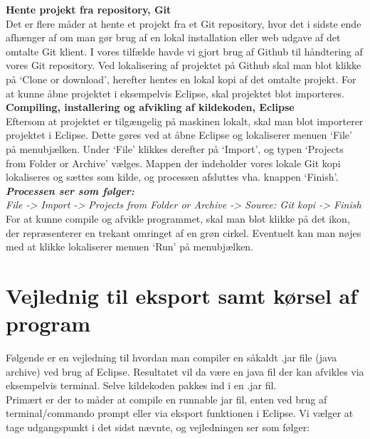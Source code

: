 \noindent \textbf{Hente projekt fra repository, Git}\\
Det er flere måder at hente et projekt fra et Git repository, hvor det i sidste ende afhænger af om man gør brug af en lokal installation eller web udgave af det omtalte Git klient. I vores tilfælde havde vi gjort brug af Github til håndtering af vores Git repository. Ved lokalisering af projektet på Github skal man blot klikke på ‘Clone or download’, herefter hentes en lokal kopi af det omtalte projekt. For at kunne åbne projektet i eksempelvis Eclipse, skal projektet blot importeres.\\

\noindent \textbf{Compiling, installering og afvikling af kildekoden, Eclipse}\\
Eftersom at projektet er tilgængelig på maskinen lokalt, skal man blot importerer projektet i Eclipse. Dette gøres ved at åbne Eclipse og lokaliserer menuen ‘File’ på menubjælken. Under ‘File’ klikkes derefter på ‘Import’, og typen ‘Projects from Folder or Archive’ vælges. Mappen der indeholder vores lokale Git kopi lokaliseres og sættes som kilde, og processen afsluttes vha. knappen ‘Finish’.\\

\noindent \textbf{\textit{Processen ser som følger:}}\\
\textit{File -> Import -> Projects from Folder or Archive -> Source: Git kopi -> Finish}\\

\noindent For at kunne compile og afvikle programmet, skal man blot klikke på det ikon, der repræsenterer en trekant omringet af en grøn cirkel. Eventuelt kan man nøjes med at klikke lokaliserer menuen ‘Run’ på menubjælken.
\newpage
\section{Vejlednig til eksport samt kørsel af program}
Følgende er en vejledning til hvordan man compiler en såkaldt .jar file (java archive) ved brug af Eclipse. Resultatet vil da være en java fil der kan afvikles via eksempelvis terminal. Selve kildekoden pakkes ind i en .jar fil.\\

\noindent Primært er der to måder at compile en runnable jar fil, enten ved brug af terminal/commando prompt eller via eksport funktionen i Eclipse. Vi vælger at tage udgangspunkt i det sidst nævnte, og vejledningen ser som følger:\\


